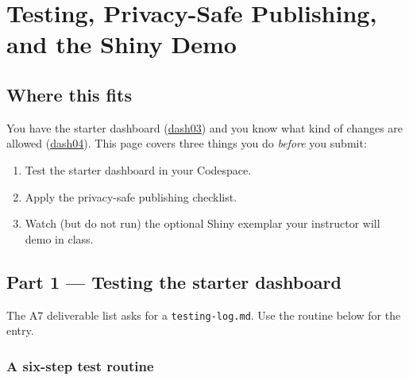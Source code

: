 \documentclass[
  letterpaper,
  DIV=11,
  numbers=noendperiod,
  oneside]{scrreprt}
\providecommand{\tightlist}{%
  \setlength{\itemsep}{0pt}\setlength{\parskip}{0pt}}
\begin{document}
\chapter*{Testing, Privacy-Safe Publishing, and the Shiny
Demo}\label{testing-privacy-safe-publishing-and-the-shiny-demo}


\section*{Where this fits}\label{where-this-fits-15}


You have the starter dashboard (\hyperref[starter-dashboard]{dash03})
and you know what kind of changes are allowed
(\hyperref[audience-facing-text-what-you-can-and-cannot-change-for-a7]{dash04}).
This page covers three things you do \emph{before} you submit:

\begin{enumerate}
\def\labelenumi{\arabic{enumi}.}
\tightlist
\item
  Test the starter dashboard in your Codespace.
\item
  Apply the privacy-safe publishing checklist.
\item
  Watch (but do not run) the optional Shiny exemplar your instructor
  will demo in class.
\end{enumerate}

\section*{Part 1 --- Testing the starter
dashboard}\label{part-1-testing-the-starter-dashboard}


The A7 deliverable list asks for a \texttt{testing-log.md}. Use the
routine below for the entry.

\subsection*{A six-step test routine}\label{a-six-step-test-routine}
\end{document}
